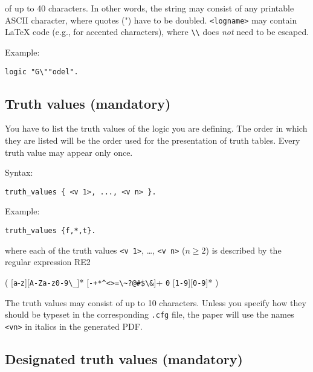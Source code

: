 \documentclass[]{article}
\newcommand{\passthrough}[1]{#1}
\begin{document}
of up to 40 characters. In other words, the string may consist of any
printable ASCII character, where quotes (") have to be doubled.
\passthrough{\lstinline!<logname>!} may contain LaTeX code (e.g., for
accented characters), where \passthrough{\lstinline!\\!} does \emph{not}
need to be escaped.

Example:

\begin{lstlisting}
logic "G\""odel".
\end{lstlisting}

\hypertarget{truth-values-mandatory}{%
\subsection{Truth values (mandatory)}\label{truth-values-mandatory}}

You have to list the truth values of the logic you are defining. The
order in which they are listed will be the order used for the
presentation of truth tables. Every truth value may appear only once.

Syntax:

\begin{lstlisting}
truth_values { <v 1>, ..., <v n> }.
\end{lstlisting}

Example:

\begin{lstlisting}
truth_values {f,*,t}.
\end{lstlisting}

where each of the truth values \passthrough{\lstinline!<v 1>!},
\ldots{}, \passthrough{\lstinline!<v n>!} (\(n \ge 2\)) is described by
the regular expression RE2

(
{[}\passthrough{\lstinline!a!}-\passthrough{\lstinline!z!}{]}{[}\passthrough{\lstinline!A-Za-z0-9\_!}{]}*
\textbar{} {[}\passthrough{\lstinline!-+*^<>=\~?@#$\&!}{]}+ \textbar{}
\passthrough{\lstinline!0!} \textbar{}
{[}\passthrough{\lstinline!1-9!}{]}{[}\passthrough{\lstinline!0-9!}{]}*
)

The truth values may consist of up to 10 characters. Unless you specify
how they should be typeset in the corresponding
\passthrough{\lstinline!.cfg!} file, the paper will use the names
\passthrough{\lstinline!<vn>!} in italics in the generated PDF.

\hypertarget{designated-truth-values-mandatory}{%
\subsection{Designated truth values
(mandatory)}\label{designated-truth-values-mandatory}}
\end{document}
